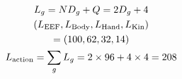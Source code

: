 \documentclass[border=7pt,varwidth=108mm]{standalone}
\begin{document}
\color{ink}\fontsize{15}{23}\selectfont
\[
\begin{gathered} L_g=ND_g+Q=2D_g+4\\ (L_{\rm EEF},L_{\rm Body},L_{\rm Hand},L_{\rm Kin})\\ =(100,62,32,14)\\ L_{\rm action}=\sum_g L_g=2\times96+4\times4=208\end{gathered}
\]
\end{document}
